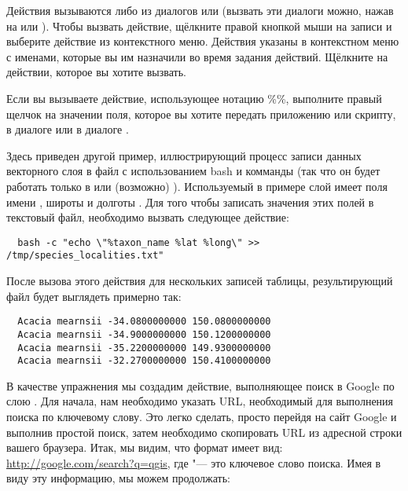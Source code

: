 Действия вызываются либо из диалогов  или
 (вызвать эти диалоги можно, нажав на
 или
). Чтобы вызвать
действие, щёлкните правой кнопкой мыши на записи и выберите действие из
контекстного меню. Действия указаны в контекстном меню с именами, которые
вы им назначили во время задания действий. Щёлкните на действии, которое
вы хотите вызвать.

Если вы вызываете действие, использующее нотацию \%\%, выполните правый
щелчок на значении поля, которое вы хотите передать приложению или скрипту,
в диалоге  или в диалоге .

Здесь приведен другой пример, иллюстрирующий процесс записи данных векторного
слоя в файл с использованием bash и комманды  (так что он
будет работать только в \nix или (возможно) \osx). Используемый в примере
слой имеет поля имени , широты  и долготы
. Для того чтобы записать значения этих полей в текстовый файл,
необходимо вызвать следующее действие:

\begin{verbatim}
  bash -c "echo \"%taxon_name %lat %long\" >> /tmp/species_localities.txt"
\end{verbatim}

После вызова этого действия для нескольких записей таблицы, результирующий
файл будет выглядеть примерно так:

\begin{verbatim}
  Acacia mearnsii -34.0800000000 150.0800000000
  Acacia mearnsii -34.9000000000 150.1200000000
  Acacia mearnsii -35.2200000000 149.9300000000
  Acacia mearnsii -32.2700000000 150.4100000000
\end{verbatim}

В качестве упражнения мы создадим действие, выполняющее поиск в Google по
слою . Для начала, нам необходимо указать URL, необходимый
для выполнения поиска по ключевому слову. Это легко сделать, просто перейдя
на сайт Google и выполнив простой поиск, затем необходимо скопировать URL
из адресной строки вашего браузера. Итак, мы видим, что формат имеет вид:
\url{http://google.com/search?q=qgis}, где \usertext{\qg} "--- это ключевое
слово поиска. Имея в виду эту информацию, мы можем продолжать:


